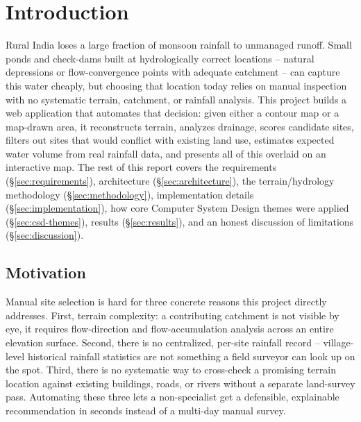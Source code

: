 \documentclass[manuscript,screen]{acmart}
\begin{document}

\maketitle

\section{Introduction}
\label{sec:intro}

Rural India loses a large fraction of monsoon rainfall to unmanaged
runoff. Small ponds and check-dams built at hydrologically correct
locations -- natural depressions or flow-convergence points with adequate
catchment -- can capture this water cheaply, but choosing that location
today relies on manual inspection with no systematic terrain, catchment,
or rainfall analysis. This project builds a web application that
automates that decision: given either a contour map or a map-drawn area,
it reconstructs terrain, analyzes drainage, scores candidate sites,
filters out sites that would conflict with existing land use, estimates
expected water volume from real rainfall data, and presents all of this
overlaid on an interactive map. The rest of this report covers the
requirements (\S\ref{sec:requirements}), architecture
(\S\ref{sec:architecture}), the terrain/hydrology methodology
(\S\ref{sec:methodology}), implementation details
(\S\ref{sec:implementation}), how core Computer System Design themes were
applied (\S\ref{sec:csd-themes}), results (\S\ref{sec:results}), and an
honest discussion of limitations (\S\ref{sec:discussion}).

\subsection{Motivation}
Manual site selection is hard for three concrete reasons this project
directly addresses. First, terrain complexity: a contributing catchment
is not visible by eye, it requires flow-direction and flow-accumulation
analysis across an entire elevation surface. Second, there is no
centralized, per-site rainfall record -- village-level historical
rainfall statistics are not something a field surveyor can look up on the
spot. Third, there is no systematic way to cross-check a promising
terrain location against existing buildings, roads, or rivers without a
separate land-survey pass. Automating these three lets a non-specialist
get a defensible, explainable recommendation in seconds instead of a
multi-day manual survey.
\end{document}
